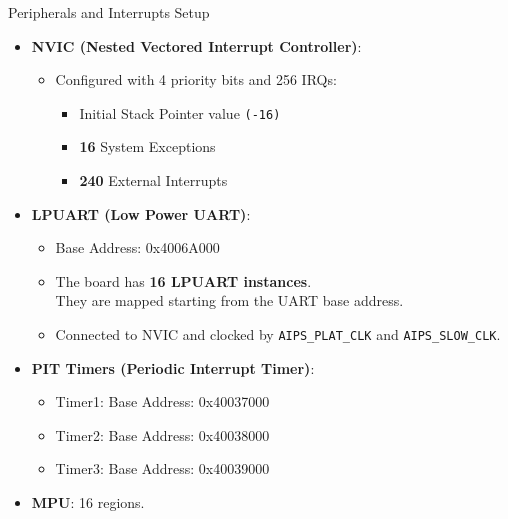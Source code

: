 \begin{frame}{Peripherals and Interrupts Setup}
    \begin{itemize}
        \item \textbf{NVIC (Nested Vectored Interrupt Controller)}:
        \begin{itemize}
            \item Configured with 4 priority bits and 256 IRQs:
                \begin{itemize}
                    \item Initial Stack Pointer value \texttt{(-16)}
                    \item \textbf{16} System Exceptions
                    \item \textbf{240} External Interrupts
                \end{itemize}
        \end{itemize}
        \item \textbf{LPUART (Low Power UART)}:
        \begin{itemize}
            \item Base Address: 0x4006A000
            \item The board has \textbf{16 LPUART instances}.\\ They are mapped starting from the UART base address. 
            \item Connected to NVIC and clocked by \texttt{AIPS\_PLAT\_CLK} and \texttt{AIPS\_SLOW\_CLK}.
        \end{itemize}
        \item \textbf{PIT Timers (Periodic Interrupt Timer)}:
        \begin{itemize}
            \item Timer1: Base Address: 0x40037000
            \item Timer2: Base Address: 0x40038000
            \item Timer3: Base Address: 0x40039000
        \end{itemize}
        \item \textbf{MPU}: 16 regions.
    \end{itemize}
\end{frame}

